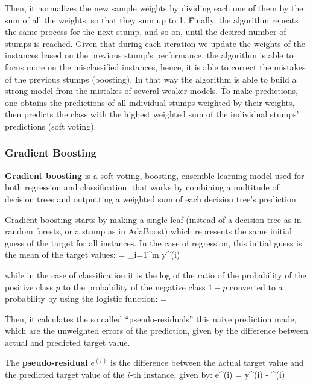 Then, it normalizes the new sample weights by dividing each one of them by the sum of all the weights, so that they
sum up to 1. \v

Finally, the algorithm repeats the same process for the next stump, and so on, until the desired number of stumps is
reached. Given that during each iteration we update the weights of the instances based on the previous stump's
performance, the algorithm is able to focus more on the misclassified instances, hence, it is able to correct the
mistakes of the previous stumps (boosting). In that way the algorithm is able to build a strong model from the
mistakes of several weaker models. \v

To make predictions, one obtains the predictions of all individual stumps weighted by their weights, then predicts
the class with the highest weighted sum of the individual stumps' predictions (soft voting).

\subsubsection{Gradient Boosting}

\textbf{Gradient boosting} is a soft voting, boosting, ensemble learning model used for both regression and
classification, that works by combining a multitude of decision trees and outputting a weighted sum of each decision
tree's prediction.
\ed

Gradient boosting starts by making a single leaf (instead of a decision tree as in random forests, or a stump as in
AdaBoost) which represents the same initial guess of the target for all instances. In the case of regression, this
initial guess is the mean of the target values:
\bse
{} =  \sum_{i=1}^{m} y^{(i)}
\ese

while in the case of classification it is the log of the ratio of the probability of the positive class $p$ to the
probability of the negative class $1-p$ converted to a probability by using the logistic function:
\bse
{} = 
\ese

\v

Then, it calculates the so called ``pseudo-residuals'' this naive prediction made, which are the unweighted errors
of the prediction, given by the difference between actual and predicted target value.

The \textbf{pseudo-residual} $e^{(i)}$ is the difference between the actual target value and the predicted target value
of the $i$-th instance, given by:
\bse
e^{(i)} = y^{(i)} - ^{(i)}
\ese

